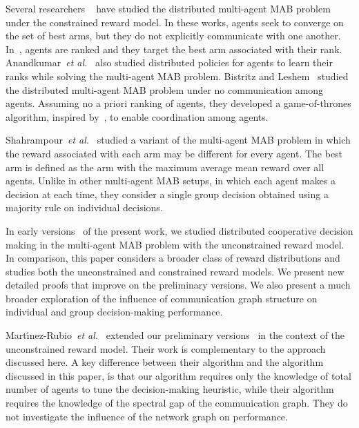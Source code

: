 \documentclass[final,5p,times,twocolumn]{elsarticle}
\def \etal {\emph{et al.}}
\theoremstyle{definition}
\begin{document}
Several researchers ~\cite{anandkumar2011distributed,liu2010distributed,kalathil2014decentralized,gai2014distributed,wei2018distributed} have studied the distributed multi-agent MAB problem under the constrained reward model. In these works, agents seek to converge on the set of best arms, but they do not explicitly communicate with one another.  %
In~\cite{kalathil2014decentralized,gai2014distributed}, agents are ranked and they target the best arm  associated with their rank. Anandkumar~\etal~\cite{anandkumar2011distributed} also studied distributed policies for agents to learn their ranks while solving the multi-agent MAB problem. Bistritz and Leshem~\cite{bistritz2018distributed} studied the distributed multi-agent MAB problem under no communication among agents. Assuming no a priori ranking of agents, they developed a game-of-thrones algorithm, inspired by~\cite{marden2014achieving}, to enable coordination among agents. 




Shahrampour~\etal~\cite{shahrampour_rakhlin_jadbabaie_2017}  studied a variant of the multi-agent MAB problem in which the reward associated with each arm may be different for every agent. The best arm is defined as the arm with the maximum average mean reward over all agents. Unlike in other multi-agent MAB setups, in which each agent makes a decision at each time, they consider a single group decision obtained using a majority rule on individual decisions. 


 In early versions~\cite{arxiv:LandgrenSL15,DBLP:journals/corr/LandgrenSL16} of the present work, we studied distributed cooperative decision making in the multi-agent MAB problem with the unconstrained reward model. In comparison, this paper considers a broader class of reward distributions and studies both the unconstrained and constrained reward models. We present new detailed proofs that improve on %
 the preliminary versions. We also present a much broader exploration of the 
 influence of communication graph structure on individual and group decision-making performance. 

Mart{\'\i}nez-Rubio~\etal~\cite{martinez2019decentralized} extended our preliminary versions~\cite{arxiv:LandgrenSL15,DBLP:journals/corr/LandgrenSL16} %
in the context of the unconstrained reward model. Their work is complementary to the approach discussed here. A key difference between their algorithm and the algorithm discussed in this paper, is that our algorithm requires only the knowledge of total number of agents to tune the decision-making heuristic, while their algorithm requires the knowledge of the spectral gap of the communication graph.  They do not investigate the influence of the network graph on performance. 
\end{document}
